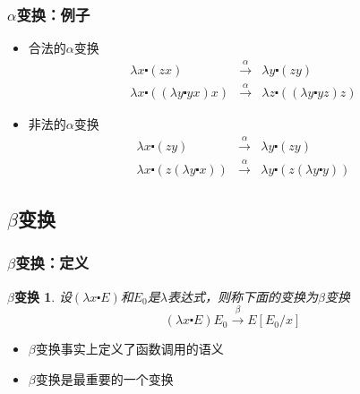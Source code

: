 \documentclass[CJKutf8,compress,hyperref]{beamer}
\begin{document}
\begin{CJK}{UTF8}{song}
\begin{frame}
  \frametitle{$\alpha$变换：例子} 
  \begin{itemize}
  \item 合法的$\alpha$变换 
    \begin{eqnarray*}
      \lambda x \centerdot (zx) & \stackrel{\alpha}{\longrightarrow} & \lambda y \centerdot (zy) \\ 
      \lambda x \centerdot ((\lambda y \centerdot yx) x) & \stackrel{\alpha}{\longrightarrow} & \lambda z  \centerdot ((\lambda y \centerdot yz) z) 
    \end{eqnarray*}
  \item 非法的$\alpha$变换
    \begin{eqnarray*}      
      \lambda x \centerdot (zy) & \stackrel{\alpha}{\longrightarrow} &  \lambda y \centerdot (zy) \\
      \lambda x \centerdot (z (\lambda y \centerdot x))  & \stackrel{\alpha}{\longrightarrow} & \lambda y \centerdot (z (\lambda y \centerdot y)) 
    \end{eqnarray*}
  \end{itemize}
\end{frame} 

\subsection{ $\beta$变换}
\begin{frame}
  \frametitle{$\beta$变换：定义} 
  \newtheorem{betaRed}{$\beta$变换}
  \begin{betaRed}
    设$(\lambda x \centerdot E)$和$E_0$是$\lambda$表达式，则称下面的变换为{\color{red}$\beta$变换}
    \begin{displaymath}
      (\lambda x \centerdot E)E_0 \stackrel{\beta}{\longrightarrow} E[E_0/x] 
    \end{displaymath} 
  \end{betaRed}
  \begin{itemize}
  \item $\beta$变换事实上定义了{\color{red}函数调用}的语义 
  \item $\beta$变换是最重要的一个变换
  \end{itemize}
\end{frame} 


\end{CJK}
\end{document}
